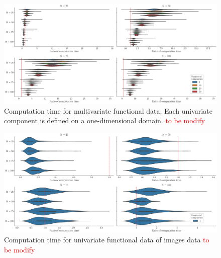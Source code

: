 \begin{results}

\begin{figure}
    \centering
    \includegraphics[scale=0.25]{figures/computation_time_pall.eps}
    \caption{Computation time for multivariate functional data. Each univariate component is defined on a one-dimensional domain. \textcolor{red}{to be modify}}
    \label{fig:computation_time_mfd_1d}
\end{figure}

\begin{figure}
    \centering
    \includegraphics[scale=0.25]{figures/computation_time_p1.eps}
    \caption{Computation time for univariate functional data of images data \textcolor{red}{to be modify}}
    \label{fig:computation_time_fd_2d}
\end{figure}

\end{results}

\begin{results}

\end{results}

\begin{results}

\end{results}

